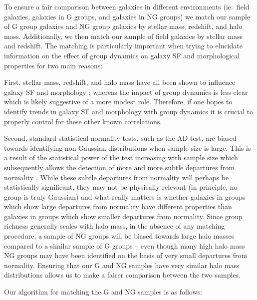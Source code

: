 \documentclass[a4paper,fleqn,usenatbib]{mnras}
\begin{document}
To ensure a fair comparison between galaxies in different environments
(ie.\ field galaxies, galaxies in G groups, and galaxies in NG groups)
we match our sample of G group galaxies and NG group galaxies by
stellar mass, redshift, and halo mass.  Additionally, we then match
our sample of field galaxies by stellar mass and redshift.  The
matching is particularly important when trying to elucidate
information on the effect of group dynamics on galaxy SF and
morphological properties for
two main reasons:
\par
First, stellar mass, redshift, and halo mass have
all been shown to influence galaxy SF and morphology
\citep[e.g.][]{brinchmann2004, feulner2005, zheng2007, cucciati2012,
  wetzel2012, lackner2013, tasca2014}; whereas
the impact of group dynamics is less clear \citep{hou2013,
  ribeiro2013} which is likely suggestive of a more modest role.
Therefore,
if one hopes to identify trends in galaxy SF and morphology with group
dynamics it is crucial to properly control for these other known correlations.
\par
Second, standard statistical normality tests, such as the AD test, are
biased towards identifying non-Gaussian distributions when
sample size is large.  This is a result of the statistical power of
the test increasing with sample size which subsequently allows the
detection of more and more subtle departures from normality
\citep{razali2011}.  While these subtle departures from normality will
perhaps be statistically significant, they may not be physically relevant (in
principle, no group is truly Gaussian) and what really matters is
whether galaxies in groups which show large departures from normality
have different properties than galaxies in groups which show smaller
departures from normality. Since group
richness generally scales with halo mass, in the absence of any matching
procedure, a sample of NG groups will be biased towards large halo
masses compared to a similar sample of G groups -- even though many
high halo mass NG groups may have been identified on the basis of very
small departures from normality.  Ensuring that our G and NG
samples have very similar halo mass distributions allows us to make a
fairer comparison between the two samples.
\par
Our algorithm for matching the G and NG samples is as follows:
\end{document}
